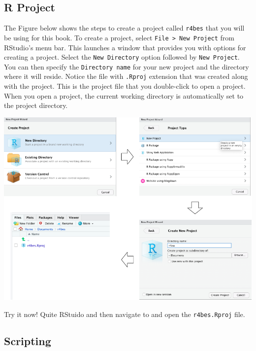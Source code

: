 \documentclass[
]{book}
\begin{document}
\hypertarget{r-project}{%
\subsection*{R Project}\label{r-project}}

The Figure below shows the steps to create a project called \texttt{r4bes} that you will be using for this book. To create a project, select \texttt{File\ \textgreater{}\ New\ Project} from RStudio's menu bar. This launches a window that provides you with options for creating a project. Select the \texttt{New\ Directory} option followed by \texttt{New\ Project}. You can then specify the \texttt{Directory\ name} for your new project and the directory where it will reside. Notice the file with \texttt{.Rproj} extension that was created along with the project. This is the project file that you double-click to open a project. When you open a project, the current working directory is automatically set to the project directory.

\begin{center}\includegraphics[width=1\linewidth]{figures/create_project} \end{center}

Try it now! Quite RStuido and then navigate to and open the \texttt{r4bes.Rproj} file.

\hypertarget{scripting}{%
\subsection*{Scripting}\label{scripting}}
\end{document}

